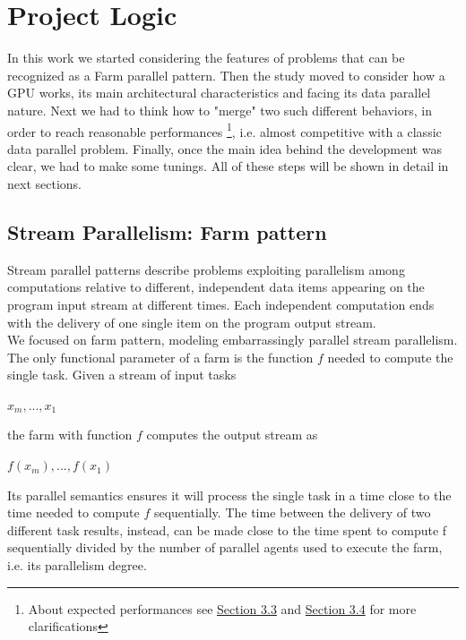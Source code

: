 \chapter{Project Logic}
\label{chap:logic}

In this work we started considering the features of problems that can be recognized as a Farm parallel pattern.
Then the study moved to consider how a GPU works, its main architectural characteristics and facing its data parallel nature.
Next we had to think how to "merge" two such different behaviors, in order to reach reasonable performances \footnote{About expected performances see \hyperref[sect:overallLogic]{Section 3.3} and \hyperref[sect:tunings]{Section 3.4} for more clarifications}, i.e. almost competitive with a classic data parallel problem.
Finally, once the main idea behind the development was clear, we had to make some tunings.
All of these steps will be shown in detail in next sections.

\section{Stream Parallelism: Farm pattern}

	Stream parallel patterns describe problems exploiting parallelism among computations relative to different, independent data items appearing on the program input stream at different times.
	Each independent computation ends with the delivery of one single item on the program output stream.\\
	We focused on farm pattern, modeling embarrassingly parallel stream parallelism.\\
	The only functional parameter of a farm is the function \(f\) needed to compute the single task.
	Given a stream of input tasks \cite{spm}
	\begin{center}
		\(x_m , . . . , x_1\)\\
	\end{center}
	the farm with function \(f\) computes the output stream as
	\begin{center}
		\(f ( x_m ), . . . , f ( x_1 )\)
	\end{center}
	Its parallel semantics ensures it will process the single task in a time close to the time needed to compute \(f\) sequentially. The time between the delivery of two different task results, instead, can be made close to the time spent to compute f sequentially divided by the number of parallel agents used to execute the farm, i.e. its parallelism degree.


